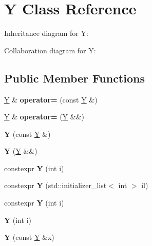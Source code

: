 \hypertarget{struct_y}{}\section{Y Class Reference}
\label{struct_y}


Inheritance diagram for Y\+:


Collaboration diagram for Y\+:
\subsection*{Public Member Functions}
\begin{DoxyCompactItemize}
\item 
\mbox{\label{struct_y_a524986cc9594d51bd7369866d4a6bbdc}} 
\mbox{\hyperlink{struct_y}{Y}} \& {\bfseries operator=} (const \mbox{\hyperlink{struct_y}{Y}} \&)
\item 
\mbox{\label{struct_y_aa3c4281978012cfa78cb628e5822e3cf}} 
\mbox{\hyperlink{struct_y}{Y}} \& {\bfseries operator=} (\mbox{\hyperlink{struct_y}{Y}} \&\&)
\item 
\mbox{\label{struct_y_a52195ab0647c8c3cd67e9653dc192fbf}} 
{\bfseries Y} (const \mbox{\hyperlink{struct_y}{Y}} \&)
\item 
\mbox{\label{struct_y_a81be47e82797f290e044e0ec4232c6f4}} 
{\bfseries Y} (\mbox{\hyperlink{struct_y}{Y}} \&\&)
\item 
\mbox{\label{struct_y_a2e9959d9603081746897b7a2f6904f93}} 
constexpr {\bfseries Y} (int i)
\item 
\mbox{\label{struct_y_a407a014e87f62dd251ba1f4eeed90b7b}} 
constexpr {\bfseries Y} (std\+::initializer\+\_\+list$<$ int $>$ il)
\item 
\mbox{\label{struct_y_a2e9959d9603081746897b7a2f6904f93}} 
constexpr {\bfseries Y} (int i)
\item 
\mbox{\label{struct_y_af1588259bfcb402645136c0b58e2f133}} 
{\bfseries Y} (int i)
\item 
\mbox{\label{struct_y_a33f97782ee65d97ae990fddb7d55495d}} 
{\bfseries Y} (const \mbox{\hyperlink{struct_y}{Y}} \&x)

\end{DoxyCompactItemize}
